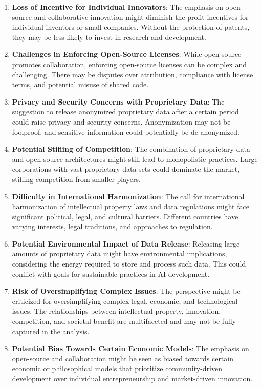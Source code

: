 \documentclass{article}[10pt]
\begin{document}
\begin{enumerate}
    \item \textbf{Loss of Incentive for Individual Innovators}: The emphasis on open-source and collaborative innovation might diminish the profit incentives for individual inventors or small companies. Without the protection of patents, they may be less likely to invest in research and development.
    \item \textbf{Challenges in Enforcing Open-Source Licenses}: While open-source promotes collaboration, enforcing open-source licenses can be complex and challenging. There may be disputes over attribution, compliance with license terms, and potential misuse of shared code.
    \item \textbf{Privacy and Security Concerns with Proprietary Data}: The suggestion to release anonymized proprietary data after a certain period could raise privacy and security concerns. Anonymization may not be foolproof, and sensitive information could potentially be de-anonymized.
    \item \textbf{Potential Stifling of Competition}: The combination of proprietary data and open-source architectures might still lead to monopolistic practices. Large corporations with vast proprietary data sets could dominate the market, stifling competition from smaller players.
    \item \textbf{Difficulty in International Harmonization}: The call for international harmonization of intellectual property laws and data regulations might face significant political, legal, and cultural barriers. Different countries have varying interests, legal traditions, and approaches to regulation.
    \item \textbf{Potential Environmental Impact of Data Release}: Releasing large amounts of proprietary data might have environmental implications, considering the energy required to store and process such data. This could conflict with goals for sustainable practices in AI development.
    \item \textbf{Risk of Oversimplifying Complex Issues}: The perspective might be criticized for oversimplifying complex legal, economic, and technological issues. The relationships between intellectual property, innovation, competition, and societal benefit are multifaceted and may not be fully captured in the analysis.
    \item \textbf{Potential Bias Towards Certain Economic Models}: The emphasis on open-source and collaboration might be seen as biased towards certain economic or philosophical models that prioritize community-driven development over individual entrepreneurship and market-driven innovation.

\end{enumerate}
\end{document}
